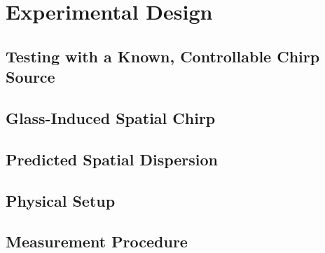 \chapter{Experimental Design}
\label{chap:experimental-design}

\section{Testing with a Known, Controllable Chirp Source}
\label{sec:exp-motivation}


\section{Glass-Induced Spatial Chirp}
\label{sec:exp-glass-chirp}


\section{Predicted Spatial Dispersion}
\label{sec:exp-predicted-dispersion}


\section{Physical Setup}
\label{sec:exp-physical-setup}


\section{Measurement Procedure}
\label{sec:exp-procedure}


